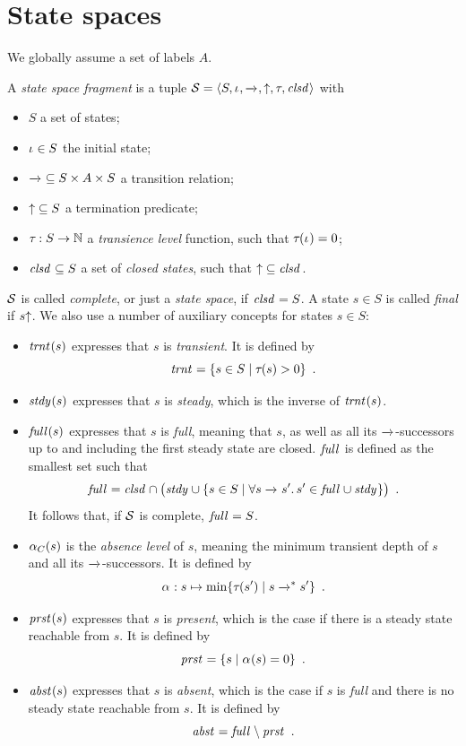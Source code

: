 \documentclass{article}
\begin{document}
\section*{State spaces}

\medskip\noindent
We globally assume a set of labels $A$.

\medskip\noindent 
A \emph{state space fragment} is a tuple $\cS=\tupof{S,\Init,{\trans{}},{\final},\TLevel,\Closed}$ with
\begin{itemize}
\item $S$ a set of states;
\item $\Init\in S$ the initial state;
\item ${\trans{}}\subseteq S\times A\times S$ a transition relation;
\item ${\final}\subseteq S$ a termination predicate;
\item ${\TLevel}:S\to \natN$ a \emph{transience level} function, such that $\TLevel(\Init)=0$;
\item $\Closed\subseteq S$ a set of \emph{closed states}, such that $\final\subseteq \Closed$.
\end{itemize}
%
$\cS$ is called \emph{complete}, or just a \emph{state space}, if $\Closed=S$. A state $s\in S$ is called \emph{final} if $s\final$. We also use a number of auxiliary concepts for states $s\in S$:

\begin{itemize}
\item $\Transient(s)$ expresses that $s$ is \emph{transient}. It is defined by
%
\[ \Transient = \gensetof{s\in S}{\TLevel(s)>0} \enspace. \]

\item $\Steady(s)$ expresses that $s$ is \emph{steady}, which is the inverse of $\Transient(s)$.

\item $\Full(s)$ expresses that $s$ is \emph{full}, meaning that $s$, as well as all its $\trans{}$-successors up to and including the first steady state are closed. $\Full$ is defined as the smallest set such that
%
\[ \Full = \Closed\cap \bigl(\Steady \cup \gensetof{s\in S}{\forall s\trans{} s'.\, s'\in \Full\cup \Steady}\bigr) \enspace.
\]
It follows that, if $\cS$ is complete, $\Full=S$.

\item $\ALevel[C](s)$ is the \emph{absence level} of $s$, meaning the minimum transient depth of $s$ and all its $\trans{}$-successors. It is defined by
%
\[ \ALevel: s\mapsto \min\gensetof{\TLevel(s')}{s\trans{}^* s'} \enspace. \]

\item $\Present(s)$ expresses that $s$ is \emph{present}, which is the case if there is a steady state reachable from $s$. It is defined by
%
\[ \Present = \gensetof{s}{\ALevel(s)=0} \enspace. \]

\item $\Absent(s)$ expresses that $s$ is \emph{absent}, which is the case if $s$ is \emph{full} and there is no steady state reachable from $s$. It is defined by
%
\[ \Absent= \Full \setminus \Present \enspace. \]
\end{itemize}
\end{document}
